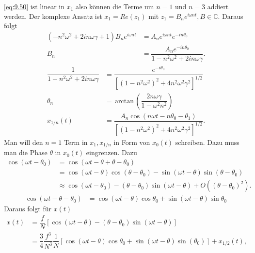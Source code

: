 \documentclass[a4paper,12pt]{article}
\numberwithin{equation}{section}
\begin{document}
\eqref{eq:9.50} ist linear in $x_1$ also können die Terme um $n=1$ und $n=3$ addiert werden. Der komplexe Ansatz ist $x_1=Re\left(z_1\right)$ mit $z_1=B_ne ^{i\omega nt},B \in \mathbb{C}$. Daraus folgt
\begin{align} 
        \left(-n^2\omega ^2+2in\omega \gamma +1\right)B_ne ^{i\omega n t}&=A_ne ^{i\omega n t}e ^{-in \theta _0}\nonumber \\
        B_n&=\dfrac{A_ne ^{-in \theta _0}}{1-n^2\omega ^2+2i n \omega \gamma }\nonumber 
.\end{align} 
\begin{align} 
        \dfrac{1}{1-n^2\omega ^2+2 i n \omega \gamma }&=\dfrac{e ^{-i \theta _0}}{\left[\left(1-n^2\omega ^2\right)^2+4n^2\omega ^2\gamma ^2\right]^{1/2}}\nonumber \\
        \theta _n&=\,\text{arctan}\,\left(\dfrac{2n\omega \gamma }{1-\omega ^2n^2}\right)\label{eq:9.51}\\
        x_{1/n}\left(t\right)&=\dfrac{A_n\cos \left(n\omega t-n \theta _0-\theta _1\right)}{\left[\left(1-n^2\omega ^2\right)^2+4n^2\omega ^2\gamma ^2\right]^{1/2}}\nonumber 
.\end{align} 
Man will den $n=1$ Term in $x_1,x_{1/n}$ in Form von $x_0\left(t\right)$ schreiben. Dazu muss man die Phase $\theta $ in $x_0\left(t\right)$ eingrenzen. Dazu
\begin{align} 
        \cos \left(\omega t-\theta _0\right)&=\cos \left(\omega t-\theta +\theta -\theta _0\right)\nonumber \\
                                            &=\cos \left(\omega t-\theta \right)\cos \left(\theta -\theta _0\right)-\sin \left(\omega t-\theta \right)\sin \left(\theta -\theta _0\right)\nonumber \\
                                            &\approx \cos \left(\omega t-\theta _0\right)-\left(\theta -\theta _0\right)\sin \left(\omega t-\theta \right)+O\left(\left(\theta -\theta _0\right)^2\right)\nonumber 
.\end{align} 
\begin{align*} 
        \cos \left(\omega t-\theta -\theta _0\right)&=\cos \left(\omega t-\theta \right)\cos \theta _0+\sin \left(\omega t-\theta \right)\sin \theta _0
\end{align*} 
Daraus folgt für $x\left(t\right)$ 
\begin{align} 
        x\left(t\right)&=\dfrac{f}{N}\left[\cos \left(\omega t-\theta \right)-\left(\theta -\theta _0\right)\sin \left(\omega t-\theta \right)\right]\nonumber \\
                       &=\dfrac{3}{4}\dfrac{f^3}{N^3}\dfrac{1}{N}\left[\cos \left(\omega t-\theta \right)\cos \theta _0+\sin \left(\omega t-\theta \right)\sin \left(\theta _0\right)\right]+x_{1/2}\left(t\right)\nonumber 
,\end{align} 
\end{document}
